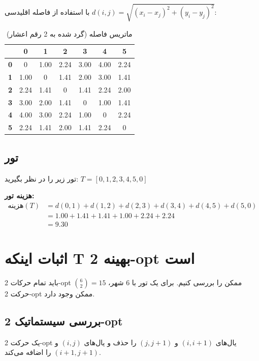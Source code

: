 \documentclass[12pt,a4paper]{article}
\begin{document}
با استفاده از فاصله اقلیدسی $d(i,j) = \sqrt{(x_i-x_j)^2 + (y_i-y_j)^2}$:

\begin{table}[h]
\centering
\small
\begin{tabular}{|c|c|c|c|c|c|c|}
\hline
 & \textbf{0} & \textbf{1} & \textbf{2} & \textbf{3} & \textbf{4} & \textbf{5} \\
\hline
\textbf{0} & 0 & 1.00 & 2.24 & 3.00 & 4.00 & 2.24 \\
\hline
\textbf{1} & 1.00 & 0 & 1.41 & 2.00 & 3.00 & 1.41 \\
\hline
\textbf{2} & 2.24 & 1.41 & 0 & 1.41 & 2.24 & 2.00 \\
\hline
\textbf{3} & 3.00 & 2.00 & 1.41 & 0 & 1.00 & 1.41 \\
\hline
\textbf{4} & 4.00 & 3.00 & 2.24 & 1.00 & 0 & 2.24 \\
\hline
\textbf{5} & 2.24 & 1.41 & 2.00 & 1.41 & 2.24 & 0 \\
\hline
\end{tabular}
\caption{ماتریس فاصله (گرد شده به 2 رقم اعشار)}
\end{table}

\subsection{تور}

تور زیر را در نظر بگیرید: $T = [0, 1, 2, 3, 4, 5, 0]$

\textbf{هزینه تور:}
\begin{align*}
\text{هزینه}(T) &= d(0,1) + d(1,2) + d(2,3) + d(3,4) + d(4,5) + d(5,0) \\
&= 1.00 + 1.41 + 1.41 + 1.00 + 2.24 + 2.24 \\
&= 9.30
\end{align*}

\section{اثبات اینکه T بهینه 2-opt است}

باید تمام حرکات 2-opt ممکن را بررسی کنیم. برای یک تور با 6 شهر، $\binom{6}{2} = 15$ حرکت 2-opt ممکن وجود دارد.

\subsection{بررسی سیستماتیک 2-opt}

یک حرکت 2-opt یال‌های $(i, i+1)$ و $(j, j+1)$ را حذف و یال‌های $(i, j)$ و $(i+1, j+1)$ را اضافه می‌کند.
\end{document}
